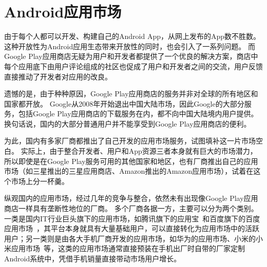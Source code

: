 %
%
%


\section{Android应用市场}
\label{sec:androidMkt}

由于每个人都可以开发、构建自己的Android App，从网上发布的App数不胜数。这种开放性为Android应用生态带来开放性的同时，也会引入了一系列问题。
而Google Play应用商店无疑为用户和开发者都提供了一个优良的解决方案，商店中每个应用底下由用户评论组成的社区也促成了用户和开发者之间的交流，用户反馈直接推动了开发者对应用的改良。

遗憾的是，由于种种原因，Google Play应用商店的服务并非对全球的所有地区和国家都开放。
Google从2008年开始退出中国大陆市场，因此Google的大部分服务，包括Google Play应用商店的下载服务在内，都不向中国大陆境内用户提供。
换句话说，国内的大部分普通用户并不能享受到Google Play应用商店的便利。

为此，国内有多家厂商都推出了自己开发的应用市场服务，试图填补这一片市场空白。
实际上，由于整合开发者、用户和App资源三者本身就有巨大的市场潜力，所以即使是在Google Play服务可用的其他国家和地区，也有厂商推出自己的应用市场（如三星推出的三星应用商店、Amazon推出的Amazon应用市场），试着在这个市场上分一杯羹。

纵观国内的应用市场，经过几年的竞争与整合，依然未有出现像Google Play应用商店一样具有垄断性地位的厂商。
多个厂商各据一方，主要可以分为两个类别。
一类是国内IT行业巨头旗下的应用市场，如腾讯旗下的应用宝~\cite{Myapp}和百度旗下的百度应用市场~\cite{Baiduappstore}，其平台本身就具有大量基础用户，可以直接转化为应用市场中的活跃用户；另一类则是由各大手机厂商开发的应用市场，如华为的应用市场、小米的小米应用市场~\cite{Xiaomiappstore}等，这类的应用市场通常直接预装在手机出厂时自带的厂家定制Android系统中，凭借手机销量直接带动市场用户增长。

